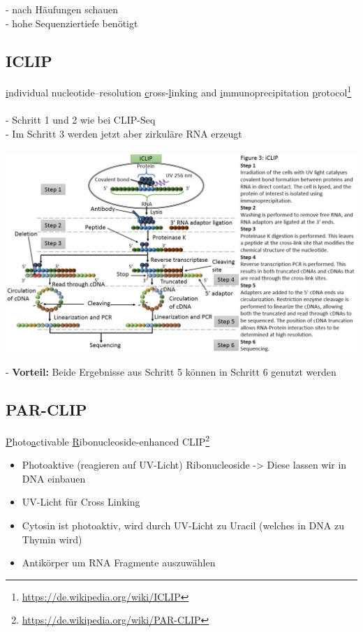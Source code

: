  - nach Häufungen schauen\\
 - hohe Sequenziertiefe benötigt

\subsection{ICLIP}
\underline{i}ndividual nucleotide–resolution \underline{c}ross-\underline{l}inking and \underline{i}mmunoprecipitation \underline{p}rotocol\footnote{\url{https://de.wikipedia.org/wiki/ICLIP}}
\\\\
- Schritt 1 und 2 wie bei CLIP-Seq\\
- Im Schritt 3 werden jetzt aber zirkuläre RNA erzeugt
\\\\
\includegraphics[width=1.2\textwidth]{lectures/160429/pix/iclip.png}

 - \textbf{Vorteil:} Beide Ergebnisse aus Schritt 5 können in Schritt 6 genutzt werden
\newpage
\subsection{PAR-CLIP}
\underline{P}hoto\underline{a}ctivable \underline{R}ibonucleoside-enhanced CLIP\footnote{\url{https://de.wikipedia.org/wiki/PAR-CLIP}}

\begin{itemize}
	\item Photoaktive (reagieren auf UV-Licht) Ribonucleoside -> Diese lassen wir in DNA einbauen
	\item UV-Licht für Cross Linking
	\item Cytosin ist photoaktiv, wird durch UV-Licht zu Uracil (welches in DNA zu Thymin wird)
	\item Antikörper um RNA Fragmente auszuwählen
\end{itemize}


